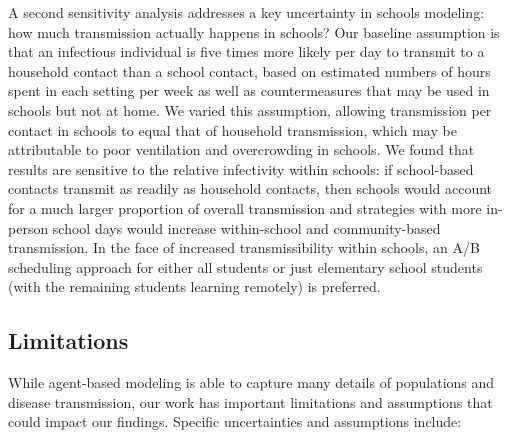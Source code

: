 \documentclass[preprint,12pt]{elsarticle}
\begin{document}
A second sensitivity analysis addresses a key uncertainty in schools modeling: how much transmission actually happens in schools? Our baseline assumption is that an infectious individual is five times more likely per day to transmit to a household contact than a school contact, based on estimated numbers of hours spent in each setting per week as well as countermeasures that may be used in schools but not at home. We varied this assumption, allowing transmission per contact in schools to equal that of household transmission, which may be attributable to poor ventilation and overcrowding in schools. We found that results are sensitive to the relative infectivity within schools: if school-based contacts transmit as readily as household contacts, then schools would account for a much larger proportion of overall transmission and strategies with more in-person school days would increase within-school and community-based transmission. In the face of increased transmissibility within schools, an A/B scheduling approach for either all students or just elementary school students (with the remaining students learning remotely) is preferred.

\subsection{Limitations}

While agent-based modeling is able to capture many details of populations and disease transmission, our work has important limitations and assumptions that could impact our findings. Specific uncertainties and assumptions include:
\end{document}
